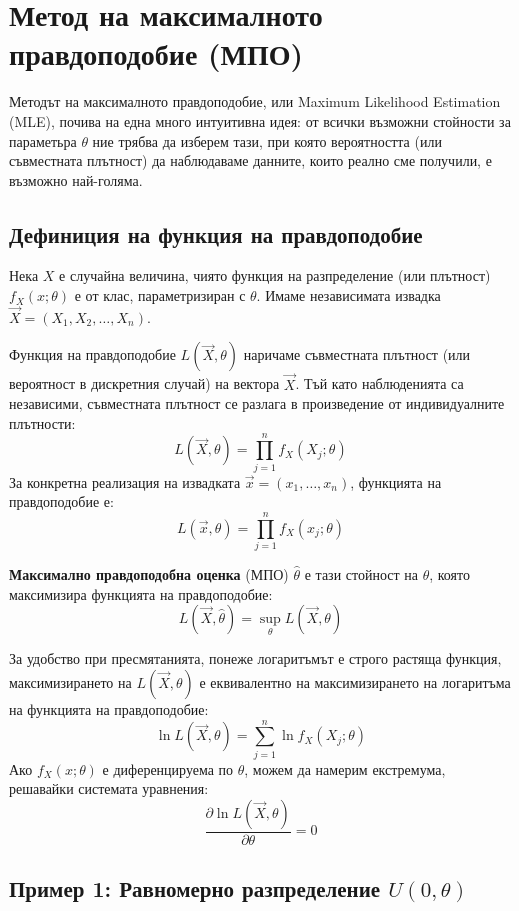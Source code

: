 \documentclass{article}
\begin{document}
\section{Метод на максималното правдоподобие (МПО)}

Методът на максималното правдоподобие, или Maximum Likelihood Estimation (MLE), почива на една много интуитивна идея: от всички възможни стойности за параметьра $\theta$ ние трябва да изберем тази, при която вероятността (или съвместната плътност) да наблюдаваме данните, които реално сме получили, е възможно най-голяма.

\subsection{Дефиниция на функция на правдоподобие}
Нека $X$ е случайна величина, чиято функция на разпределение (или плътност) $f_X(x; \theta)$ е от клас, параметризиран с $\theta$. Имаме независимата извадка $\vec{X} = (X_1, X_2, \dots, X_n)$. 

Функция на правдоподобие $L(\vec{X}, \theta)$ наричаме съвместната плътност (или вероятност в дискретния случай) на вектора $\vec{X}$. Тъй като наблюденията са независими, съвместната плътност се разлага в произведение от индивидуалните плътности:
\[
    L(\vec{X}, \theta) = \prod_{j=1}^n f_X(X_j; \theta)
\]
За конкретна реализация на извадката $\vec{x} = (x_1, \dots, x_n)$, функцията на правдоподобие е:
\[
    L(\vec{x}, \theta) = \prod_{j=1}^n f_X(x_j; \theta)
\]

\textbf{Максимално правдоподобна оценка} (МПО) $\hat{\theta}$ е тази стойност на $\theta$, която максимизира функцията на правдоподобие:
\[
    L(\vec{X}, \hat{\theta}) = \sup_{\theta} L(\vec{X}, \theta)
\]

За удобство при пресмятанията, понеже логаритъмът е строго растяща функция, максимизирането на $L(\vec{X}, \theta)$ е еквивалентно на максимизирането на логаритъма на функцията на правдоподобие:
\[
    \ln L(\vec{X}, \theta) = \sum_{j=1}^n \ln f_X(X_j; \theta)
\]
Ако $f_X(x; \theta)$ е диференцируема по $\theta$, можем да намерим екстремума, решавайки системата уравнения:
\[
    \frac{\partial \ln L(\vec{X}, \theta)}{\partial \theta} = 0
\]

\subsection{Пример 1: Равномерно разпределение $U(0, \theta)$}
\end{document}
